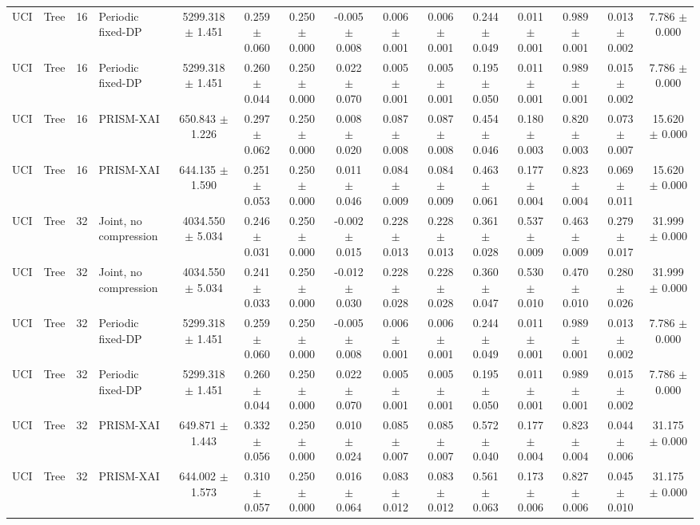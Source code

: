 \begin{tabular}{llllccccccccccc}
UCI & Tree & 16 & Periodic fixed-DP & 5299.318 $\pm$ 1.451 & 0.259 $\pm$ 0.060 & 0.250 $\pm$ 0.000 & -0.005 $\pm$ 0.008 & 0.006 $\pm$ 0.001 & 0.006 $\pm$ 0.001 & 0.244 $\pm$ 0.049 & 0.011 $\pm$ 0.001 & 0.989 $\pm$ 0.001 & 0.013 $\pm$ 0.002 & 7.786 $\pm$ 0.000 \\
UCI & Tree & 16 & Periodic fixed-DP & 5299.318 $\pm$ 1.451 & 0.260 $\pm$ 0.044 & 0.250 $\pm$ 0.000 & 0.022 $\pm$ 0.070 & 0.005 $\pm$ 0.001 & 0.005 $\pm$ 0.001 & 0.195 $\pm$ 0.050 & 0.011 $\pm$ 0.001 & 0.989 $\pm$ 0.001 & 0.015 $\pm$ 0.002 & 7.786 $\pm$ 0.000 \\
UCI & Tree & 16 & PRISM-XAI & 650.843 $\pm$ 1.226 & 0.297 $\pm$ 0.062 & 0.250 $\pm$ 0.000 & 0.008 $\pm$ 0.020 & 0.087 $\pm$ 0.008 & 0.087 $\pm$ 0.008 & 0.454 $\pm$ 0.046 & 0.180 $\pm$ 0.003 & 0.820 $\pm$ 0.003 & 0.073 $\pm$ 0.007 & 15.620 $\pm$ 0.000 \\
UCI & Tree & 16 & PRISM-XAI & 644.135 $\pm$ 1.590 & 0.251 $\pm$ 0.053 & 0.250 $\pm$ 0.000 & 0.011 $\pm$ 0.046 & 0.084 $\pm$ 0.009 & 0.084 $\pm$ 0.009 & 0.463 $\pm$ 0.061 & 0.177 $\pm$ 0.004 & 0.823 $\pm$ 0.004 & 0.069 $\pm$ 0.011 & 15.620 $\pm$ 0.000 \\
UCI & Tree & 32 & Joint, no compression & 4034.550 $\pm$ 5.034 & 0.246 $\pm$ 0.031 & 0.250 $\pm$ 0.000 & -0.002 $\pm$ 0.015 & 0.228 $\pm$ 0.013 & 0.228 $\pm$ 0.013 & 0.361 $\pm$ 0.028 & 0.537 $\pm$ 0.009 & 0.463 $\pm$ 0.009 & 0.279 $\pm$ 0.017 & 31.999 $\pm$ 0.000 \\
UCI & Tree & 32 & Joint, no compression & 4034.550 $\pm$ 5.034 & 0.241 $\pm$ 0.033 & 0.250 $\pm$ 0.000 & -0.012 $\pm$ 0.030 & 0.228 $\pm$ 0.028 & 0.228 $\pm$ 0.028 & 0.360 $\pm$ 0.047 & 0.530 $\pm$ 0.010 & 0.470 $\pm$ 0.010 & 0.280 $\pm$ 0.026 & 31.999 $\pm$ 0.000 \\
UCI & Tree & 32 & Periodic fixed-DP & 5299.318 $\pm$ 1.451 & 0.259 $\pm$ 0.060 & 0.250 $\pm$ 0.000 & -0.005 $\pm$ 0.008 & 0.006 $\pm$ 0.001 & 0.006 $\pm$ 0.001 & 0.244 $\pm$ 0.049 & 0.011 $\pm$ 0.001 & 0.989 $\pm$ 0.001 & 0.013 $\pm$ 0.002 & 7.786 $\pm$ 0.000 \\
UCI & Tree & 32 & Periodic fixed-DP & 5299.318 $\pm$ 1.451 & 0.260 $\pm$ 0.044 & 0.250 $\pm$ 0.000 & 0.022 $\pm$ 0.070 & 0.005 $\pm$ 0.001 & 0.005 $\pm$ 0.001 & 0.195 $\pm$ 0.050 & 0.011 $\pm$ 0.001 & 0.989 $\pm$ 0.001 & 0.015 $\pm$ 0.002 & 7.786 $\pm$ 0.000 \\
UCI & Tree & 32 & PRISM-XAI & 649.871 $\pm$ 1.443 & 0.332 $\pm$ 0.056 & 0.250 $\pm$ 0.000 & 0.010 $\pm$ 0.024 & 0.085 $\pm$ 0.007 & 0.085 $\pm$ 0.007 & 0.572 $\pm$ 0.040 & 0.177 $\pm$ 0.004 & 0.823 $\pm$ 0.004 & 0.044 $\pm$ 0.006 & 31.175 $\pm$ 0.000 \\
UCI & Tree & 32 & PRISM-XAI & 644.002 $\pm$ 1.573 & 0.310 $\pm$ 0.057 & 0.250 $\pm$ 0.000 & 0.016 $\pm$ 0.064 & 0.083 $\pm$ 0.012 & 0.083 $\pm$ 0.012 & 0.561 $\pm$ 0.063 & 0.173 $\pm$ 0.006 & 0.827 $\pm$ 0.006 & 0.045 $\pm$ 0.010 & 31.175 $\pm$ 0.000 \\
\bottomrule
\end{tabular}
